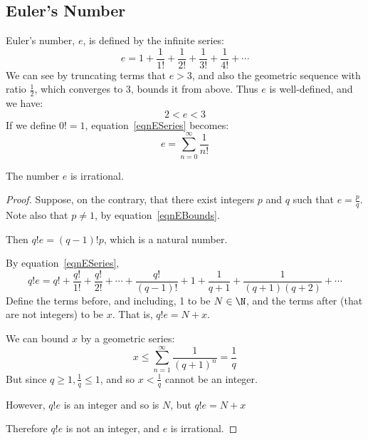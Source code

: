 \documentclass[../Main.tex]{subfiles}
\begin{document}
\subsection{Euler's Number}
Euler's number, $e$, is defined by the infinite series:
\begin{equation}
    e = 1 + \frac{1}{1!} + \frac{1}{2!} + \frac{1}{3!} + \frac{1}{4!} + \cdots
    \label{eqnESeries}
\end{equation}
We can see by truncating terms that $e > 3$, and also the geometric sequence with ratio $\frac{1}{2}$, which converges to $3$, bounds it from above.
Thus $e$ is well-defined, and we have:
\begin{equation}
    2 < e < 3
    \label{eqnEBounds}
\end{equation}
If we define $0! = 1$, equation~\ref{eqnESeries} becomes:
\begin{equation}
    e = \sum_{n=0}^{\infty} \frac{1}{n!}
    \label{eqnESum}
\end{equation}
\begin{proposition}
    The number $e$ is irrational.
    \label{propEIrrational}
\end{proposition}
\begin{proof}
    Suppose, on the contrary, that there exist integers $p$ and $q$ such that $e = \frac{p}{q}$. Note also that $p \neq 1$, by equation~\ref{eqnEBounds}.\par
    Then $q!e = (q-1)!p$, which is a natural number.\par
    By equation~\ref{eqnESeries},
    \begin{equation*}
        q!e = q! + \frac{q!}{1!} + \frac{q!}{2!} + \cdots + \frac{q!}{(q-1)!} + 1 + \frac{1}{q+1} + \frac{1}{(q + 1)(q + 2)} + \cdots
    \end{equation*}
    Define the terms before, and including, 1 to be $N \in \N$, and the terms after (that are not integers) to be $x$. That is, $q!e = N + x$.\par
    We can bound $x$ by a geometric series:
    \begin{equation*}
        x \leq \sum_{n=1}^{\infty} \frac{1}{(q+1)^n} = \frac{1}{q}
    \end{equation*}
    But since $q \geq 1, \frac{1}{q} \leq 1$, and so $x < \frac{1}{q}$ cannot be an integer.\par
    However, $q!e$ is an integer and so is $N$, but $q!e = N + x$ \contradiction\par
    Therefore $q!e$ is not an integer, and $e$ is irrational.
\end{proof}
\end{document}
